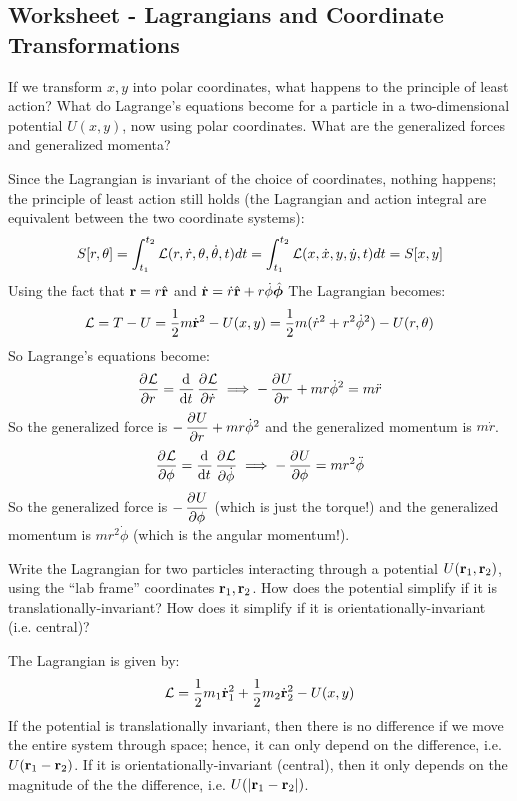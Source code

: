 \subsection{Worksheet - Lagrangians and Coordinate Transformations}
\begin{p}
If we transform $x, y$ into polar coordinates, what happens to the principle of least action? What do Lagrange’s equations become for a particle in a two-dimensional potential $U(x,y)$, now using polar coordinates. What are the generalized forces and generalized momenta? 
\end{p}
\begin{s}
Since the Lagrangian is invariant of the choice of coordinates, nothing happens; the principle of least action still holds (the Lagrangian and action integral are equivalent between the two coordinate systems):
\[S[r, \theta] = \int_{t_1}^{t_2}\mathcal{L}(r, \dot{r}, \theta, \dot{\theta}, t)dt = \int_{t_1}^{t_2} \mathcal{L}(x, \dot{x}, y, \dot{y}, t)dt = S[x, y]\]
Using the fact that $\mathbf{r} = r\hat{\mathbf{r}}$ and $\dot{\mathbf{r}} = \dot{r}\hat{\mathbf{r}} + r\dot{\phi}\hat{\bm{\phi}}$ The Lagrangian becomes:
\[\mathcal{L} = T - U = \frac{1}{2}m\dot{\mathbf{r}}^2 - U(x,y) = \frac{1}{2}m(\dot{r}^2 + r^2\dot{\phi}^2) - U(r, \theta)\]
So Lagrange's equations become:
\[\dpd{\LL}{r} = \dod{}{t}\dpd{\LL}{\dot{r}} \implies -\dpd{U}{r} + mr\dot{\phi}^2 = m\ddot{r}\]
So the generalized force is $-\dpd{U}{r} + mr\dot{\phi}^2$ and the generalized momentum is $m\dot{r}$.
\[\dpd{\LL}{\phi} = \dod{}{t}\dpd{\LL}{\dot{\phi}} \implies -\dpd{U}{\phi} = mr^2\ddot{\phi}  \]
So the generalized force is $-\dpd{U}{\phi}$ (which is just the torque!) and the generalized momentum is $mr^2\dot{\phi}$ (which is the angular momentum!).
\end{s}

\begin{p}
Write the Lagrangian for two particles interacting through a potential $U(\mathbf{r}_1, \mathbf{r}_2)$, using the “lab frame” coordinates $\mathbf{r}_1, \mathbf{r}_2$. How does the potential simplify if it is translationally-invariant? How does it simplify if it is orientationally-invariant (i.e. central)? 
\end{p}
\begin{s}
The Lagrangian is given by:
\[\mathcal{L} = \frac{1}{2}m_1\dot{\mathbf{r}}_1^2 + \frac{1}{2}m_2\dot{\mathbf{r}}_2^2 - U(x,y)\]
If the potential is translationally invariant, then there is no difference if we move the entire system through space; hence, it can only depend on the difference, i.e. $U(\mathbf{r}_1 - \mathbf{r}_2)$. If it is orientationally-invariant (central), then it only depends on the magnitude of the the difference, i.e. $U(\abs{\mathbf{r}_1 - \mathbf{r}_2})$.
\end{s}


